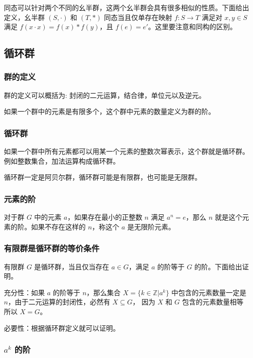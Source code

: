 同态可以针对两个不同的幺半群，这两个幺半群会具有很多相似的性质。下面给出定义，幺半群 $(S, \cdot)$ 和 $(T, *)$ 同态当且仅单存在映射 $f: S \to T$
满足对 $x,y \in S $ 满足 $f(x \cdot x) = f(x) * f(y)$，且 $f(e) = e'$。这里要注意和同构的区别。


\subsection{循环群}

\subsubsection{群的定义}

群的定义可以概括为: 封闭的二元运算，结合律，单位元以及逆元。

如果一个群中的元素是有限多个，这个群中元素的数量定义为群的阶。


\subsubsection{循环群}

如果一个群中所有元素都可以用某一个元素的整数次幂表示，这个群就是循环群。例如整数集合，加法运算构成循环群。

循环群一定是阿贝尔群，循环群可能是有限群，也可能是无限群。

\subsubsection{元素的阶}

对于群 $G$ 中的元素 $a$，如果存在最小的正整数 $n$ 满足 $a^n = e$，那么 $n$ 就是这个元素的阶。如果不存在这样的 $n$，称这个 $a$ 是无限阶元素。


\subsubsection{有限群是循环群的等价条件}

有限群 $G$ 是循环群，当且仅当存在 $a \in G$，满足 $a$ 的阶等于 $G$ 的阶。下面给出证明。

充分性：如果 $a$ 的阶等于 $n$，那么集合 $X = \{ k \in \mathbb{Z} | a^k \}$ 中包含的元素数量一定是 $n$，由于二元运算的封闭性，必然有 $X \subseteq G$，
因为 $X$ 和 $G$ 包含的元素数量相等所以 $X = G$。

必要性：根据循环群定义就可以证明。


\subsubsection{$a^k$ 的阶}

